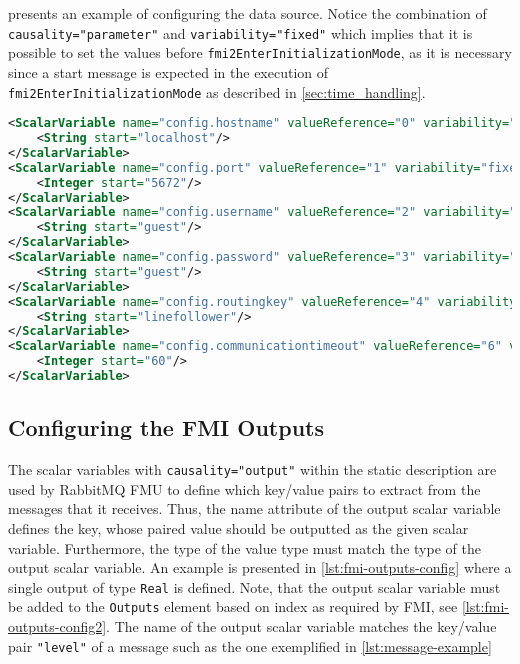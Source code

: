  presents an example of configuring the data
source. Notice the combination of \texttt{causality="parameter"} and
\texttt{variability="fixed"} which implies that it is possible to set the values
before \texttt{fmi2EnterInitiali\-za\-tion\-Mode}, as it is necessary since a start
message is expected in the execution of \texttt{fmi2EnterInitializationMode} as
described in \cref{sec:time_handling}.
\begin{lstlisting}[label={lst:data-source-config},caption={Data source
    configuration of RabbitMQ FMU},language=XML]
<ScalarVariable name="config.hostname" valueReference="0" variability="fixed" causality="parameter">
    <String start="localhost"/>
</ScalarVariable>
<ScalarVariable name="config.port" valueReference="1" variability="fixed" causality="parameter">
    <Integer start="5672"/>
</ScalarVariable>
<ScalarVariable name="config.username" valueReference="2" variability="fixed" causality="parameter">
    <String start="guest"/>
</ScalarVariable>
<ScalarVariable name="config.password" valueReference="3" variability="fixed" causality="parameter">
    <String start="guest"/>
</ScalarVariable>
<ScalarVariable name="config.routingkey" valueReference="4" variability="fixed" causality="parameter">
    <String start="linefollower"/>
</ScalarVariable>
<ScalarVariable name="config.communicationtimeout" valueReference="6" variability="fixed" causality="parameter" description="Network read time out in seconds">
    <Integer start="60"/>
</ScalarVariable>
  \end{lstlisting}


\subsection{Configuring the FMI Outputs}
The scalar variables with \texttt{causality="output"} within the static
description are used by RabbitMQ FMU to define which key/value pairs to extract
from the messages that it receives. Thus, the name attribute of the output
scalar variable defines the key, whose paired value should be outputted as the
given scalar variable. Furthermore, the type of the value type must match the type of the
output scalar variable. An example is presented in \cref{lst:fmi-outputs-config}
where a single output of type \texttt{Real} is defined. Note, that the output
scalar variable must be added to the \texttt{Outputs} element based on index as
required by FMI, see \cref{lst:fmi-outputs-config2}. The name of the output scalar variable matches the
key/value pair \texttt{"level"} of a message such as the one exemplified in \cref{lst:message-example}

